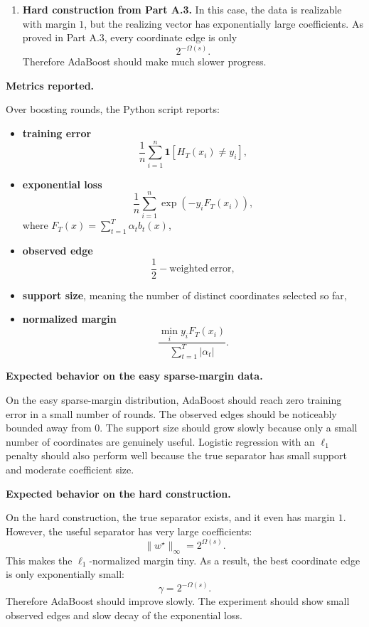 \documentclass[11pt]{article}
\newcommand{\ind}{\mathbf{1}}
\begin{document}
\begin{enumerate}
\begin{solutionbox}
\begin{enumerate}[leftmargin=2em]
        \item \textbf{Hard construction from Part A.3.}
        In this case, the data is realizable with margin $1$, but the realizing vector has
        exponentially large coefficients. As proved in Part A.3, every coordinate edge is only
        \[
        2^{-\Omega(s)}.
        \]
        Therefore AdaBoost should make much slower progress.
    \end{enumerate}

    \medskip

    \textbf{Metrics reported.}

    Over boosting rounds, the Python script reports:

    \begin{itemize}[leftmargin=2em]
        \item \textbf{training error}
        \[
        \frac1n\sum_{i=1}^n \ind[H_T(x_i)\ne y_i],
        \]
        \item \textbf{exponential loss}
        \[
        \frac1n\sum_{i=1}^n \exp(-y_iF_T(x_i)),
        \]
        where $F_T(x)=\sum_{t=1}^T\alpha_tb_t(x)$,
        \item \textbf{observed edge}
        \[
        \frac12-\mathrm{weighted\ error},
        \]
        \item \textbf{support size}, meaning the number of distinct coordinates selected so far,
        \item \textbf{normalized margin}
        \[
        \frac{\min_i y_iF_T(x_i)}{\sum_{t=1}^T|\alpha_t|}.
        \]
    \end{itemize}

    \medskip

    \textbf{Expected behavior on the easy sparse-margin data.}

    On the easy sparse-margin distribution, AdaBoost should reach zero training error in a small
    number of rounds. The observed edges should be noticeably bounded away from $0$. The support
    size should grow slowly because only a small number of coordinates are genuinely useful.
    Logistic regression with an $\ell_1$ penalty should also perform well because the true
    separator has small support and moderate coefficient size.

    \medskip

    \textbf{Expected behavior on the hard construction.}

    On the hard construction, the true separator exists, and it even has margin $1$. However, the
    useful separator has very large coefficients:
    \[
    \|w^\star\|_\infty=2^{\Omega(s)}.
    \]
    This makes the $\ell_1$-normalized margin tiny. As a result, the best coordinate edge is only
    exponentially small:
    \[
    \gamma=2^{-\Omega(s)}.
    \]
    Therefore AdaBoost should improve slowly. The experiment should show small observed edges and
    slow decay of the exponential loss.


\end{solutionbox}
\end{enumerate}
\end{document}
